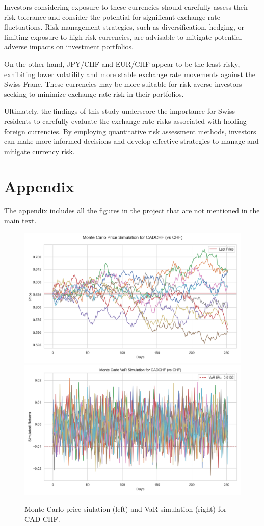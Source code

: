 \documentclass{article}
\begin{document}
Investors considering exposure to these currencies should carefully assess their risk tolerance and consider the potential for significant exchange rate fluctuations. Risk management strategies, such as diversification, hedging, or limiting exposure to high-risk currencies, are advisable to mitigate potential adverse impacts on investment portfolios.

On the other hand, JPY/CHF and EUR/CHF appear to be the least risky, exhibiting lower volatility and more stable exchange rate movements against the Swiss Franc. These currencies may be more suitable for risk-averse investors seeking to minimize exchange rate risk in their portfolios.

Ultimately, the findings of this study underscore the importance for Swiss residents to carefully evaluate the exchange rate risks associated with holding foreign currencies. By employing quantitative risk assessment methods, investors can make more informed decisions and develop effective strategies to manage and mitigate currency risk.


\section*{Appendix}
The appendix includes all the figures in the project that are not mentioned in the main text.

\begin{figure}[H]
    \centering  \includegraphics[width=0.48\linewidth]{reports/figures/monte_carlo_price_simulation_CADCHF_vs_CHF.png} \label{fig:monte_carlo_price_simulation_CADCHF_vs_CHF}
    \includegraphics[width=0.48\linewidth]{reports/figures/monte_carlo_var_simulation_CADCHF_vs_CHF.png} \label{fig:monte_carlo_var_simulation_CADCHF_vs_CHF}
    \caption{\footnotesize Monte Carlo price siulation (left) and VaR simulation (right) for CAD-CHF.}
\end{figure}
\end{document}
